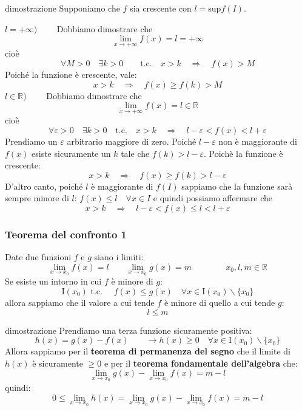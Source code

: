 \documentclass[x11names]{article}
\begin{document}
\begin{es}{dimostrazione}
Supponiamo che $f$ sia crescente con $l = \text{sup}f(I)$.

$l = + \infty\text{)} \qquad$ Dobbiamo dimostrare che
\[
\lim_{x \to + \infty}f(x) = l = + \infty
\]
cioè
\[
\forall M > 0 \quad \exists k > 0  \qquad \text{t.c.} \quad x > k  \quad \Longrightarrow \quad f(x) > M
\]
Poiché la funzione è crescente, vale:
\[
x > k \quad \Longrightarrow \quad f(x) \geq f(k) > M
\]
$l \in \mathbb{R} \text{)} \qquad$ Dobbiamo dimostrare che 
\[
\lim_{x \to + \infty}f(x) = l \in \mathbb{R}
\]
cioè
\[
\forall \varepsilon > 0 \quad \exists k > 0 \quad \text{t.c.} \quad x>k \quad \Longrightarrow \quad l -\varepsilon < f(x) < l + \varepsilon
\]
Prendiamo un $\varepsilon$ arbitrario maggiore di zero. Poiché $l-\varepsilon$ non è maggiorante di $f(x)$ esiste sicuramente un $k$ tale che $f(k) > l - \varepsilon$. Poichè la funzione è crescente:
\[
x > k \quad \Longrightarrow \quad f(x) \geq f(k) > l - \varepsilon
\]
D'altro canto, poiché $l$ è maggiorante di $f(I)$ sappiamo che la funzione sarà sempre minore di $l$: $f(x) \leq l \quad \forall x \in I$ e quindi possiamo affermare che
\[
x > k \quad \Longrightarrow \quad l - \varepsilon < f(x) \leq l < l + \varepsilon
\]
\end{es}




\begin{center}
\colorbox{myred}{\begin{minipage}{5.75in}
\begin{redes}{}
\subsubsection{Teorema del confronto 1}
Date due funzioni $f$ e $g$ siano i limiti:
\[
\lim_{x \to x_0} f(x)  = l \qquad \lim_{x \to x_0} g(x)  = m \qquad \qquad x_0,l,m \in \mathbb{R}
\]
Se esiste un intorno in cui $f$ è minore di $g$: 
\[
\text{I}(x_0) \text{  t.c. } \quad f(x) \leq g(x) \quad \forall x \in \text{I}(x_0) \backslash \{x_0\}
\]
allora sappiamo che il valore a cui tende $f$ è minore di quello a cui tende $g$:
\[
l \leq m
\]
\end{redes}
\end{minipage}}        
\end{center}

\begin{es}{dimostrazione}
Prendiamo una terza funzione sicuramente positiva:
\[
h(x) = g(x) - f(x) \qquad \to h(x) \geq 0 \quad \forall x \in \text{I}(x_0) \backslash \{x_0\}
\]
Allora sappiamo per il \textbf{teorema di permanenza del segno} che il limite di $h(x)$ è sicuramente $\geq 0$ e per il \textbf{teorema fondamentale dell'algebra} che:
\[
\lim_{x \to x_0} g(x)- \lim_{x \to x_0} f(x) = m - l
\]
quindi:
\[
0 \leq  \lim_{x \to x_0} h(x) = \lim_{x \to x_0} g(x)- \lim_{x \to x_0} f(x) = m - l
\]
\end{es}
\end{document}
